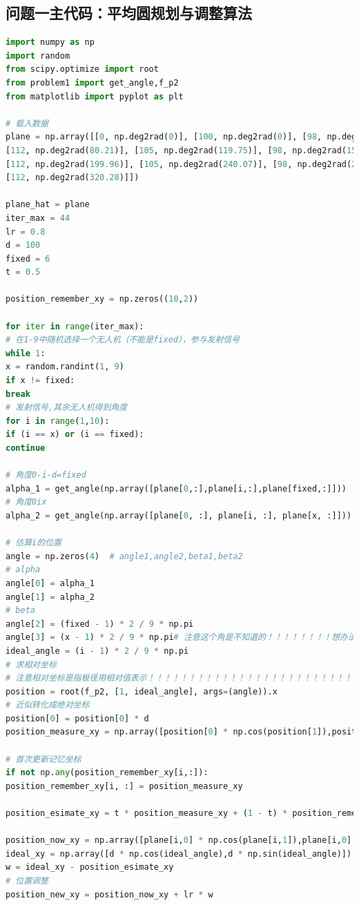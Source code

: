 \documentclass[withoutpreface,bwprint]{cumcmthesis} %
\begin{document}
	\subsection{问题一主代码：平均圆规划与调整算法}
	\begin{lstlisting}[language=python]
import numpy as np
import random
from scipy.optimize import root
from problem1 import get_angle,f_p2
from matplotlib import pyplot as plt

# 载入数据
plane = np.array([[0, np.deg2rad(0)], [100, np.deg2rad(0)], [98, np.deg2rad(40.10)],
[112, np.deg2rad(80.21)], [105, np.deg2rad(119.75)], [98, np.deg2rad(159.86)],
[112, np.deg2rad(199.96)], [105, np.deg2rad(240.07)], [98, np.deg2rad(280.17)],
[112, np.deg2rad(320.28)]])

plane_hat = plane
iter_max = 44
lr = 0.8
d = 100
fixed = 6
t = 0.5

position_remember_xy = np.zeros((10,2))

for iter in range(iter_max):
# 在1-9中随机选择一个无人机（不能是fixed），参与发射信号
while 1:
x = random.randint(1, 9)
if x != fixed:
break
# 发射信号,其余无人机得到角度
for i in range(1,10):
if (i == x) or (i == fixed):
continue

# 角度0-i-d=fixed
alpha_1 = get_angle(np.array([plane[0,:],plane[i,:],plane[fixed,:]]))
# 角度0ix
alpha_2 = get_angle(np.array([plane[0, :], plane[i, :], plane[x, :]]))

# 估算i的位置
angle = np.zeros(4)  # angle1,angle2,beta1,beta2
# alpha
angle[0] = alpha_1
angle[1] = alpha_2
# beta
angle[2] = (fixed - 1) * 2 / 9 * np.pi
angle[3] = (x - 1) * 2 / 9 * np.pi# 注意这个角是不知道的！！！！！！！！想办法改
ideal_angle = (i - 1) * 2 / 9 * np.pi
# 求相对坐标
# 注意相对坐标是指极径用相对值表示！！！！！！！！！！！！！！！！！！！！！！！！！！！！！！！！！！！！！！！！！！！！！！！
position = root(f_p2, [1, ideal_angle], args=(angle)).x
# 近似转化成绝对坐标
position[0] = position[0] * d
position_measure_xy = np.array([position[0] * np.cos(position[1]),position[0] * np.sin(position[1])])

# 首次更新记忆坐标
if not np.any(position_remember_xy[i,:]):
position_remember_xy[i, :] = position_measure_xy

position_esimate_xy = t * position_measure_xy + (1 - t) * position_remember_xy[i, :]

position_now_xy = np.array([plane[i,0] * np.cos(plane[i,1]),plane[i,0] * np.sin(plane[i,1])])
ideal_xy = np.array([d * np.cos(ideal_angle),d * np.sin(ideal_angle)])
w = ideal_xy - position_esimate_xy
# 位置调整
position_new_xy = position_now_xy + lr * w


\end{lstlisting}
\end{document}
